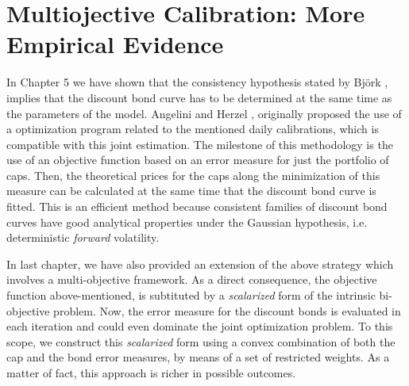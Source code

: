 \chapter{Multiojective Calibration: More Empirical Evidence}

In Chapter 5 we have shown that the consistency hypothesis stated by
Bj\"ork \cite{BG:1999,BC:1999}, implies that the discount bond curve 
has to be determined at the same time as the parameters of the
model. Angelini and Herzel \cite{AH:2002, AH:2005}, originally proposed
the use of a optimization program related to the mentioned daily
calibrations, which is compatible with this joint estimation. %
The milestone of this methodology is the use of an objective function
based on an error measure for just the portfolio of caps. Then, the
theoretical prices for the caps along the minimization of this measure
can be calculated at the same time that the discount bond curve is
fitted. This is an efficient method because consistent families of
discount bond curves have good analytical properties under the
Gaussian hypothesis, i.e. deterministic {\sl forward} volatility.

In last chapter, we have also provided an extension of the above
strategy which involves a multi-objective framework. As a direct
consequence, the objective function above-mentioned, is subtituted by
a {\sl scalarized} form of the intrinsic bi-objective problem. Now,
the error measure for the discount bonds is evaluated in each
iteration and could even dominate the joint optimization problem. To
this scope, we construct this {\sl scalarized} form using a convex
combination of both the cap and the bond error measures, by means of a
set of restricted weights. As a matter of fact, this approach is
richer in possible outcomes. 




